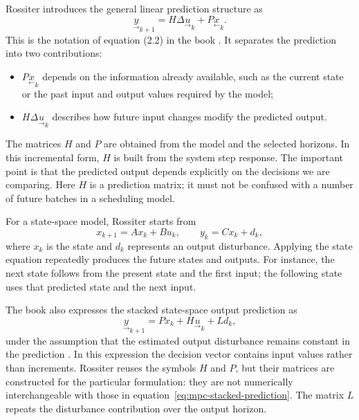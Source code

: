 Rossiter introduces the general linear prediction structure as
\begin{equation}
    \underset{\rightarrow}{y}_{k+1}
       =H\Delta\underset{\rightarrow}{u}_k
        +P\underset{\leftarrow}{x}_k.
    \label{eq:mpc-stacked-prediction}
\end{equation}
This is the notation of equation (2.2) in the book \cite[Section 2.3.2]{Rossiter2018}. It separates the prediction into two contributions:
\begin{itemize}
    \item $P\underset{\leftarrow}{x}_k$ depends on the information already available, such as the current state or the past input and output values required by the model;
    \item $H\Delta\underset{\rightarrow}{u}_k$ describes how future input changes modify the predicted output.
\end{itemize}

The matrices $H$ and $P$ are obtained from the model and the selected horizons. In this incremental form, $H$ is built from the system step response. The important point is that the predicted output depends explicitly on the decisions we are comparing. Here $H$ is a prediction matrix; it must not be confused with a number of future batches in a scheduling model.

For a state-space model, Rossiter starts from
\begin{equation}
    x_{k+1}=Ax_k+Bu_k,\qquad y_k=Cx_k+d_k,
    \label{eq:mpc-linear-model}
\end{equation}
where $x_k$ is the state and $d_k$ represents an output disturbance. Applying the state equation repeatedly produces the future states and outputs. For instance, the next state follows from the present state and the first input; the following state uses that predicted state and the next input.

The book also expresses the stacked state-space output prediction as
\begin{equation}
    \underset{\rightarrow}{y}_{k+1}
       =Px_k+H\underset{\rightarrow}{u}_k+Ld_k,
    \label{eq:mpc-state-space-output}
\end{equation}
under the assumption that the estimated output disturbance remains constant in the prediction \cite[Section 2.4.2, equation (2.14)]{Rossiter2018}. In this expression the decision vector contains input values rather than increments. Rossiter reuses the symbols $H$ and $P$, but their matrices are constructed for the particular formulation: they are not numerically interchangeable with those in equation~\eqref{eq:mpc-stacked-prediction}. The matrix $L$ repeats the disturbance contribution over the output horizon.

